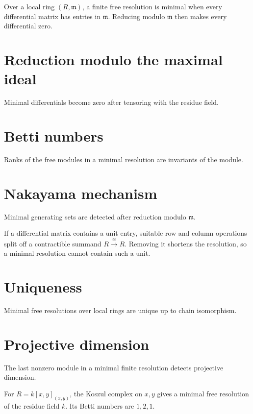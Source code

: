\begin{example}\label{ex:v25-expand-01}
Over a local ring $(R,\mathfrak m)$, a finite free resolution is minimal when every differential matrix has entries in $\mathfrak m$. Reducing modulo $\mathfrak m$ then makes every differential zero.
\end{example}
\section{Reduction modulo the maximal ideal}
Minimal differentials become zero after tensoring with the residue field.

\section{Betti numbers}
Ranks of the free modules in a minimal resolution are invariants of the module.

\section{Nakayama mechanism}
Minimal generating sets are detected after reduction modulo $\mathfrak m$.

\begin{example}\label{ex:v25-expand-02}
If a differential matrix contains a unit entry, suitable row and column operations split off a contractible summand $R\xrightarrow{\cong}R$. Removing it shortens the resolution, so a minimal resolution cannot contain such a unit.
\end{example}
\section{Uniqueness}
Minimal free resolutions over local rings are unique up to chain isomorphism.

\section{Projective dimension}
The last nonzero module in a minimal finite resolution detects projective dimension.

\begin{example}\label{ex:v25-expand-03}
For $R=k[x,y]_{(x,y)}$, the Koszul complex on $x,y$ gives a minimal free resolution of the residue field $k$. Its Betti numbers are $1,2,1$.
\end{example}
